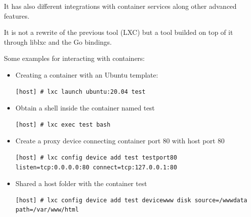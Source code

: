 It has also different integrations with container services along other advanced features.

It is not a rewrite of the previous tool (LXC) but a tool builded on top of it through liblxc and the Go bindings.

Some examples for interacting with containers:

\begin{itemize}
	\item{Creating a container with an Ubuntu template}:
	      \begin{verbatim}
[host] # lxc launch ubuntu:20.04 test
	\end{verbatim}
	\item{Obtain a shell inside the container named test}
	      \begin{verbatim}
[host] # lxc exec test bash 
	\end{verbatim}
	\item{Create a proxy device connecting container port 80 with host port 80}
	      \begin{verbatim}
[host] # lxc config device add test testport80 listen=tcp:0.0.0.0:80 connect=tcp:127.0.0.1:80 
	\end{verbatim}
	\item{Shared a host folder with the container test}
	      \begin{verbatim}
[host] # lxc config device add test devicewww disk source=/wwwdata path=/var/www/html 
	\end{verbatim}
\end{itemize}







